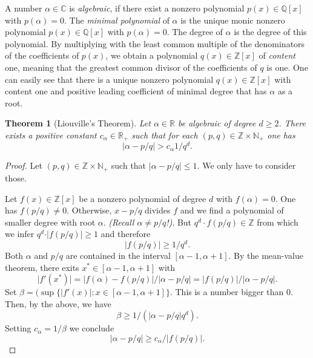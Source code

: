 \documentclass[a4paper,11pt,american]{article}
\newcommand{\N}{\mathbb{N}}
\newcommand{\Q}{\mathbb{Q}}
\newcommand{\R}{\mathbb{R}}
\newcommand{\Z}{\mathbb{Z}}
\newcommand{\C}{\mathbb{C}}
\theoremstyle{plain}
\newtheorem{theorem}{Theorem}
\theoremstyle{definition}
\begin{document}
A number $\alpha \in\C$ is \emph{algebraic}, if there exist a nonzero polynomial $p(x) \in \Q[x]$ with $p(\alpha) = 0$. The \emph{minimal polynomial} of $\alpha$ is the unique monic nonzero polynomial $p(x) \in\Q[x]$ with $p(\alpha) = 0$. The degree of $\alpha$ is the degree of this polynomial.  By multiplying with the least common multiple of the denominators of the coefficients of $p(x)$, we obtain a polynomial $q(x) \in\Z[x]$ of \emph{content} one, meaning that the greatest common divisor of the coefficients of $q$ is one. One can easily see that there is a unique nonzero polynomial $q(x) \in\Z[x]$ with content one and positive leading coefficient of minimal degree that has $\alpha$ as a root.

\begin{theorem}[Liouville's Theorem]
  \label{thr:5}
  Let $\alpha\in\R$ be algebraic of degree $d\geq2$. There exists a positive constant $c_\alpha \in \R_+$ such that for each $(p,q) \in \Z \times \N_+$ one has
  \begin{displaymath}
    \vert  \alpha - p/q \vert  > c_\alpha 1/q^d. 
  \end{displaymath}
\end{theorem}

\begin{proof}
  Let $(p,q) \in \Z \times\N_+$ such that  $\vert  \alpha - p/q \vert  \leq1$. We only have to consider those. 

  Let $f(x) \in \Z[x]$ be a nonzero polynomial of degree $d$ with $f(\alpha) = 0$.  One has $f(p/q) \neq 0$. Otherwise, $x- p/q$ divides $f$ and we find a polynomial of smaller degree with root $\alpha$. \emph{(Recall $\alpha \neq p/q$!)}.  But $q^d \cdot f(p/q) \in\Z$ from which we infer $q^d \cdot \vert f(p/q)\vert  \geq1$ and therefore 
  \begin{displaymath}
     \vert f(p/q)\vert  \geq1 / q^d. 
   \end{displaymath}
   Both $\alpha$ and $p/q$ are contained in the interval $[\alpha -1, \alpha+1]$. 
  By the mean-value theorem, there exits $x^* \in [\alpha -1, \alpha+1]$ with
  \begin{displaymath}
    \vert f'(x^*)\vert  = \vert f(\alpha) - f(p/q)\vert  / \vert \alpha - p/q\vert  = \vert f(p/q)\vert  / \vert \alpha - p/q\vert  . 
  \end{displaymath}
  Set $\beta = (\sup\{ \vert f'(x)\vert:x \in [\alpha-1 ,\alpha+1]\}$. This is a number bigger than $0$.   Then, by the above, we have 
  \begin{displaymath}
    \beta \geq 1/ ( \vert \alpha - p/q\vert  q^d). 
  \end{displaymath}
  Setting $c_\alpha = 1/ \beta$ we conclude 
  \begin{displaymath}
    \vert \alpha - p/q\vert  \geq c_\alpha / \vert f(p/q)\vert . 
  \end{displaymath}
\end{proof}
\end{document}
